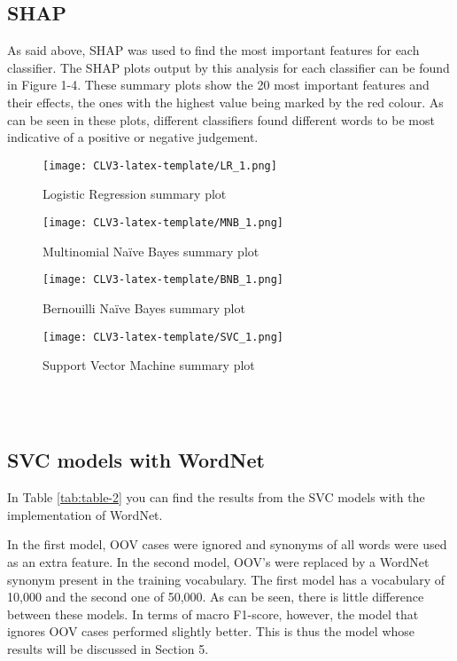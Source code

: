 \documentclass[final]{clv3} %
\begin{document}
\subsection{SHAP}

As said above, SHAP \cite{shap} was used to find the most important features for each classifier. The SHAP plots output by this analysis for each classifier can be found in Figure 1-4.  These summary plots show the 20 most important features and their effects, the ones with the highest value being marked by the red colour. As can be seen in these plots, different classifiers found different words to be most indicative of a positive or negative judgement.


\begin{figure}[h]
    \texttt{[image: CLV3-latex-template/LR\_1.png]}
    \caption{Logistic Regression summary plot}\label{fig:shap-lr}
\endminipage
{}
    \texttt{[image: CLV3-latex-template/MNB\_1.png]}
    \caption{Multinomial Naïve Bayes summary plot}\label{fig:shap-mnb}
\endminipage
\end{figure}
\begin{figure}[h]
%
    \texttt{[image: CLV3-latex-template/BNB\_1.png]}
    \caption{Bernouilli Naïve Bayes summary plot}\label{fig:shap-bnb}
\endminipage
{}%
    \texttt{[image: CLV3-latex-template/SVC\_1.png]}
    \caption{Support Vector Machine summary plot}\label{fig:shap-bnb}
\endminipage
\end{figure}\\\

\newpage

\subsection{SVC models with WordNet}

In Table \ref{tab:table-2} you can find the results from the SVC models with the implementation of WordNet.

In the first model, OOV cases were ignored and synonyms of all words were used as an extra feature. In the second model, OOV's were replaced by a WordNet synonym present in the training vocabulary. The first model has a vocabulary of 10,000  and the second one of 50,000. As can be seen, there is little difference between these models. In terms of macro F1-score, however, the model that ignores OOV cases performed slightly better. This is thus the model whose results will be discussed in Section 5.
\end{document}
